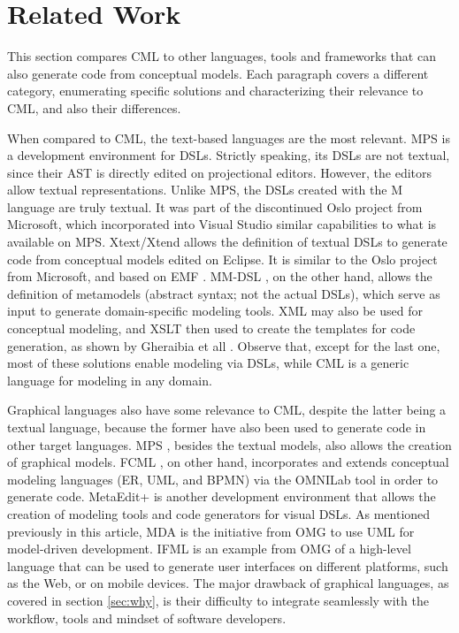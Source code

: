 \section{Related Work}\label{sec:related}

This section compares CML to other languages, tools and frameworks
that can also generate code from conceptual models.
Each paragraph covers a different category,
enumerating specific solutions and characterizing their relevance to CML,
and also their differences.

When compared to CML, the text-based languages are the most relevant.
MPS \cite{voelter} is a development environment for DSLs.
Strictly speaking, its DSLs are not textual,
since their AST is directly edited on projectional editors.
However, the editors allow textual representations.
Unlike MPS, the DSLs created with the M language \cite{mlang} are truly textual. It was part of the discontinued Oslo project from Microsoft,
which incorporated into Visual Studio similar capabilities to what is available on MPS.
Xtext/Xtend \cite{xtext} allows the definition of textual DSLs
to generate code from conceptual models edited on Eclipse.
It is similar to the Oslo project from Microsoft,
and based on EMF \cite{emf}.
MM-DSL \cite{mm-dsl}, on the other hand,
allows the definition of metamodels (abstract syntax; not the actual DSLs),
which serve as input to generate domain-specific modeling tools.
XML may also be used for conceptual modeling,
and XSLT then used to create the templates for code generation,
as shown by Gheraibia et all \cite{xslt}.
Observe that, except for the last one,
most of these solutions enable modeling via DSLs,
while CML is a generic language for modeling in any domain.

Graphical languages also have some relevance to CML,
despite the latter being a textual language,
because the former have also been used to generate code in other target languages.
MPS \cite{voelter},
besides the textual models,
also allows the creation of graphical models.
FCML \cite{fcml}, on other hand,
incorporates and extends conceptual modeling languages (ER, UML, and BPMN)
via the OMNILab tool in order to generate code.
MetaEdit+ \cite{metaedit} is another development environment
that allows the creation of modeling tools
and code generators for visual DSLs.
As mentioned previously in this article,
MDA \cite{mda} is the initiative from OMG
to use UML \cite{uml} for model-driven development.
IFML \cite{ifml} is an example from OMG of a high-level language
that can be used to generate user interfaces on different platforms,
such as the Web, or on mobile devices.
The major drawback of graphical languages,
as covered in section \ref{sec:why},
is their difficulty to integrate seamlessly with the workflow, tools and mindset of software developers.

